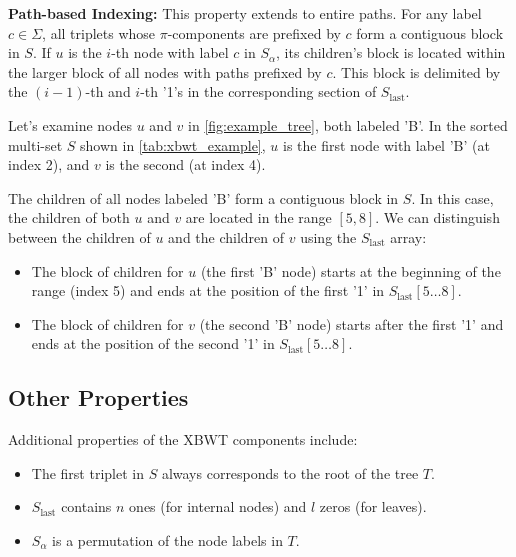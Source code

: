 \textbf{Path-based Indexing:} This property extends to entire paths. For any label $c \in \Sigma$, all triplets whose $\pi$-components are prefixed by $c$ form a contiguous block in $S$. If $u$ is the $i$-th node with label $c$ in $S_{\alpha}$, its children's block is located within the larger block of all nodes with paths prefixed by $c$. This block is delimited by the $(i-1)$-th and $i$-th '1's in the corresponding section of $S_{\text{last}}$. \label{prop3}
\begin{example}
    Let's examine nodes $u$ and $v$ in \cref{fig:example_tree}, both labeled 'B'. In the sorted multi-set $S$ shown in \cref{tab:xbwt_example}, $u$ is the first node with label 'B' (at index 2), and $v$ is the second (at index 4).

    The children of all nodes labeled 'B' form a contiguous block in $S$. In this case, the children of both $u$ and $v$ are located in the range $[5, 8]$. We can distinguish between the children of $u$ and the children of $v$ using the $S_{\text{last}}$ array:
    \begin{itemize}
        \item The block of children for $u$ (the first 'B' node) starts at the beginning of the range (index 5) and ends at the position of the first '1' in $S_{\text{last}}[5\dots8]$.
        \item The block of children for $v$ (the second 'B' node) starts after the first '1' and ends at the position of the second '1' in $S_{\text{last}}[5\dots8]$.
    \end{itemize}
\end{example}

\subsection{Other Properties}
Additional properties of the XBWT components include:

\begin{itemize}
    \item The first triplet in $S$ always corresponds to the root of the tree $T$.
    \item $S_{\text{last}}$ contains $n$ ones (for internal nodes) and $l$ zeros (for leaves).
    \item $S_{\alpha}$ is a permutation of the node labels in $T$.
\end{itemize}

